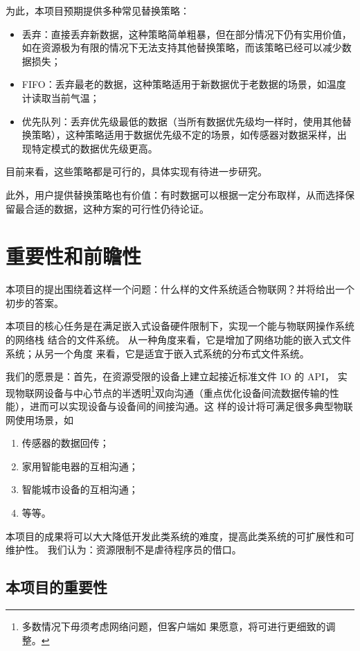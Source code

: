 \documentclass{ctexart}
\begin{document}
为此，本项目预期提供多种常见替换策略：
\begin{itemize}
 \item 丢弃：直接丢弃新数据，这种策略简单粗暴，但在部分情况下仍有实用价值，如在资源极为有限的情况下无法支持其他替换策略，而该策略已经可以减少数据损失；
 \item FIFO：丢弃最老的数据，这种策略适用于新数据优于老数据的场景，如温度计读取当前气温；
 \item 优先队列：丢弃优先级最低的数据（当所有数据优先级均一样时，使用其他替换策略），这种策略适用于数据优先级不定的场景，如传感器对数据采样，出现特定模式的数据优先级更高。
\end{itemize}
目前来看，这些策略都是可行的，具体实现有待进一步研究。

此外，用户提供替换策略也有价值：有时数据可以根据一定分布取样，从而选择保留最合适的数据，这种方案的可行性仍待论证。

\section{重要性和前瞻性}

本项目的提出围绕着这样一个问题：什么样的文件系统适合物联网？并将给出一个初步的答案。

本项目的核心任务是在满足嵌入式设备硬件限制下，实现一个能与物联网操作系统的网络栈
结合的文件系统。 从一种角度来看，它是增加了网络功能的嵌入式文件系统；从另一个角度
来看，它是适宜于嵌入式系统的分布式文件系统。

我们的愿景是：首先，在资源受限的设备上建立起接近标准文件 IO 的 API，
实现物联网设备与中心节点的半透明\footnote{多数情况下毋须考虑网络问题，但客户端如
	果愿意，将可进行更细致的调整。}双向沟通（重点优化设备间流数据传输的性能），进而可以实现设备与设备间的间接沟通。这
样的设计将可满足很多典型物联网使用场景，如
\begin{enumerate}
	\item 传感器的数据回传；
	\item 家用智能电器的互相沟通；
	\item 智能城市设备的互相沟通；
	\item 等等。
\end{enumerate}
本项目的成果将可以大大降低开发此类系统的难度，提高此类系统的可扩展性和可维护性。
我们认为：资源限制不是虐待程序员的借口。

\subsection{本项目的重要性}
\end{document}
